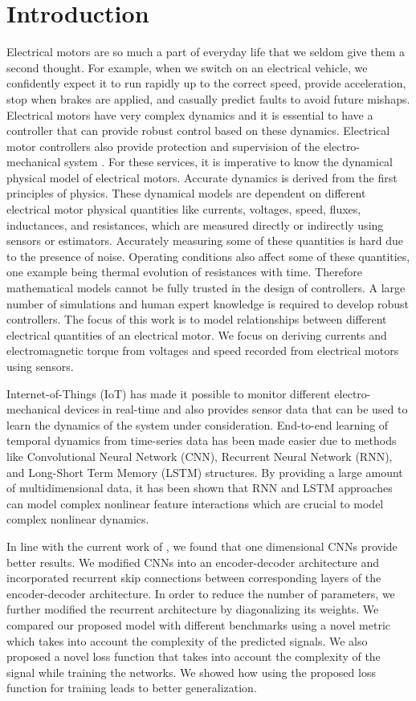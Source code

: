 \documentclass[letterpaper]{article}
\begin{document}
\section{Introduction}
\label{sec:intro}
Electrical motors are so much a part of everyday life that we seldom give them a second thought. For example, when we switch on an electrical vehicle, we confidently expect it to run rapidly up to the correct speed, provide acceleration, stop when brakes are applied, and casually predict faults to avoid future mishaps. Electrical motors have very complex dynamics and it is essential to have a controller that can provide robust control based on these dynamics. Electrical motor controllers also provide protection and supervision of the electro-mechanical system \cite{Sylvester1987,Siskind1978cpts}. For these services, it is imperative to know the dynamical physical model of electrical motors. Accurate dynamics is derived from the first principles of physics. These dynamical models are dependent on different electrical motor physical quantities like currents, voltages, speed, fluxes, inductances, and resistances, which are measured directly or indirectly using sensors or estimators. Accurately measuring some of these quantities is hard due to the presence of noise. Operating conditions also affect some of these quantities, one example being thermal evolution of resistances with time. Therefore mathematical models cannot be fully trusted in the design of controllers. A large number of simulations and human expert knowledge is required to develop robust controllers. The focus of this work is to model relationships between different electrical quantities of an electrical motor. We focus on deriving currents and electromagnetic torque from voltages and speed recorded from electrical motors using sensors.

Internet-of-Things (IoT) has made it possible to monitor different electro-mechanical devices in real-time and also provides sensor data that can be used to learn the dynamics of the system under consideration. End-to-end learning of temporal dynamics from time-series data has been made easier due to methods like Convolutional Neural Network (CNN), Recurrent Neural Network (RNN), and Long-Short Term Memory (LSTM) structures. By providing a large amount of multidimensional data, it has been shown that RNN and LSTM approaches can model complex nonlinear feature interactions which are crucial to model complex nonlinear dynamics.

In line with the current work of \cite{miller2018stable},
we found that one dimensional CNNs provide better results. We modified CNNs into an encoder-decoder architecture and incorporated recurrent skip connections between corresponding layers of the encoder-decoder architecture. In order to reduce the number of parameters, we further modified the recurrent architecture by diagonalizing its weights. We compared our proposed model with different benchmarks using a novel metric which takes into account the complexity of the predicted signals. We also proposed a novel loss function that takes into account the complexity of the signal while training the networks. We showed how using the proposed loss function for training leads to better generalization.
\end{document}
